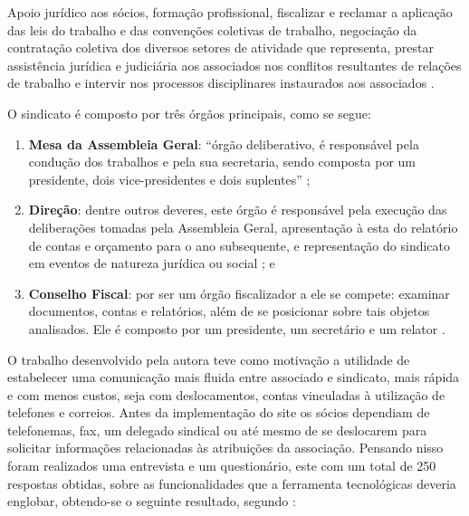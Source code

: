 \begin{citacao}
Apoio jurídico aos sócios, formação profissional, fiscalizar e reclamar a aplicação das leis do trabalho e das convenções coletivas de trabalho, negociação da contratação coletiva dos diversos setores de atividade que representa, prestar assistência jurídica e judiciária aos associados nos conflitos resultantes de relações de trabalho e intervir nos processos disciplinares instaurados aos associados .
\end{citacao}

O sindicato é composto por três órgãos principais, como se segue:

\begin{enumerate}
 \item \textbf{Mesa da Assembleia Geral}: ``órgão deliberativo, é responsável pela condução dos trabalhos e pela sua secretaria, sendo composta por um presidente, dois vice-presidentes e dois suplentes'' ;
 \item \textbf{Direção}: dentre outros deveres, este órgão é responsável pela execução das deliberações tomadas pela Assembleia Geral, apresentação à esta do relatório de contas e orçamento para o ano subsequente, e representação do sindicato em eventos de natureza jurídica ou social ; e
 \item \textbf{Conselho Fiscal}: por ser um órgão fiscalizador a ele se compete: examinar documentos, contas e relatórios, além de se posicionar sobre tais objetos analisados. Ele é composto por um presidente, um secretário e um relator . 
\end{enumerate}

O trabalho desenvolvido pela autora teve como motivação a utilidade de estabelecer uma comunicação mais fluida entre associado e sindicato, mais rápida e com menos custos, seja com deslocamentos, contas vinculadas à utilização de telefones e correios. Antes da implementação do site os sócios dependiam de telefonemas, fax, um delegado sindical ou até mesmo de se deslocarem para solicitar informações relacionadas às atribuições da associação. Pensando nisso foram realizados uma entrevista e um questionário, este com um total de 250 respostas obtidas, sobre as funcionalidades que a ferramenta tecnológicas deveria englobar, obtendo-se o seguinte resultado, segundo :

